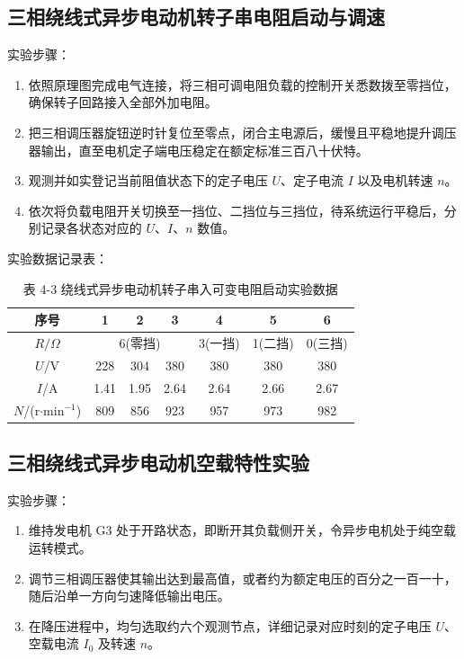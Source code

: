 \begin{framed}
{			\subsection{三相绕线式异步电动机转子串电阻启动与调速}
			实验步骤：
			\begin{enumerate}
				\item 依照原理图完成电气连接，将三相可调电阻负载的控制开关悉数拨至零挡位，确保转子回路接入全部外加电阻。
				\item 把三相调压器旋钮逆时针复位至零点，闭合主电源后，缓慢且平稳地提升调压器输出，直至电机定子端电压稳定在额定标准三百八十伏特。
				\item 观测并如实登记当前阻值状态下的定子电压 $U$、定子电流 $I$ 以及电机转速 $n$。
				\item 依次将负载电阻开关切换至一挡位、二挡位与三挡位，待系统运行平稳后，分别记录各状态对应的 $U$、$I$、$n$ 数值。
			\end{enumerate}
			
			实验数据记录表：
			\begin{table}[H]
				\centering
				\caption{\hspace{0.5em}表 4-3 绕线式异步电动机转子串入可变电阻启动实验数据}
				\begin{tabular}{c|c|c|c|c|c|c}
					\hline
					序号 & 1 & 2 & 3 & 4 & 5 & 6 \\
					\hline
					$R/\Omega$ & \multicolumn{3}{|c|}{6(零挡)} & 3(一挡) & 1(二挡) & 0(三挡) \\
					\hline
					$U$/V & 228 & 304 & 380 & 380 & 380 & 380 \\
					\hline
					$I$/A & 1.41 & 1.95 & 2.64 & 2.64 & 2.66 & 2.67 \\
					\hline
					$N$/(r$\cdot$min$^{-1}$) & 809 & 856 & 923 & 957 & 973 & 982 \\
					\hline
				\end{tabular}
			\end{table}
			
			\subsection{三相绕线式异步电动机空载特性实验}
			实验步骤：
			\begin{enumerate}
				\item 维持发电机 G3 处于开路状态，即断开其负载侧开关，令异步电机处于纯空载运转模式。
				\item 调节三相调压器使其输出达到最高值，或者约为额定电压的百分之一百一十，随后沿单一方向匀速降低输出电压。
				\item 在降压进程中，均匀选取约六个观测节点，详细记录对应时刻的定子电压 $U$、空载电流 $I_0$ 及转速 $n$。
			\end{enumerate}
			
}
\end{framed}
